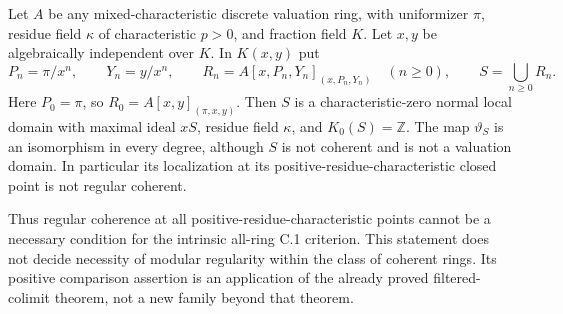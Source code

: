 \begin{proposition}
\label{C:noncoherent-positive-boundary}
Let $A$ be any mixed-characteristic discrete valuation ring,
with uniformizer $\pi$, residue field $\kappa$ of characteristic
$p>0$, and fraction field $K$.
Let $x,y$ be algebraically independent over $K$.  In $K(x,y)$ put
\[
 P_n=\pi/x^n,\qquad Y_n=y/x^n,\qquad
 R_n=A[x,P_n,Y_n]_{(x,P_n,Y_n)}\quad(n\geq0),
 \qquad S=\bigcup_{n\geq0}R_n.                     \tag{C.1.NC1}
\]
Here $P_0=\pi$, so
$R_0=A[x,y]_{(\pi,x,y)}$.
Then $S$ is a characteristic-zero normal local domain with
maximal ideal $xS$, residue field $\kappa$, and
$K_0(S)=\mathbb Z$.  The map $\vartheta_S$ is an isomorphism
in every degree, although $S$ is not coherent and is not
a valuation domain.  In particular its localization at its
positive-residue-characteristic closed point is not
regular coherent.

Thus regular coherence at all positive-residue-characteristic
points cannot be a necessary condition for the intrinsic
all-ring C.1 criterion.  This statement does not decide
necessity of modular regularity within the class of coherent
rings.  Its positive comparison assertion is an application
of the already proved filtered-colimit theorem, not a new
family beyond that theorem.
\end{proposition}
